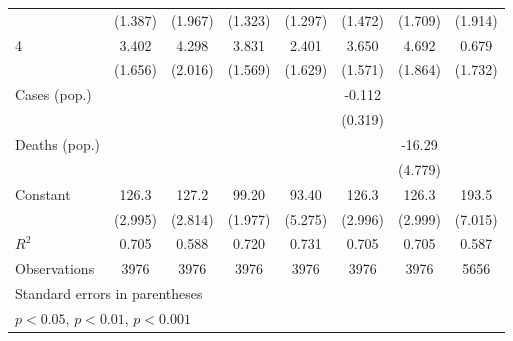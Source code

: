 \documentclass{article}
\begin{document}
{\begin{longtable}{l*{7}{c}}
                &  (1.387)         &  (1.967)         &  (1.323)         &  (1.297)         &  (1.472)         &  (1.709)         &  (1.914)         \\
4               &    3.402\sym{*}  &    4.298\sym{*}  &    3.831\sym{*}  &    2.401         &    3.650\sym{*}  &    4.692\sym{*}  &    0.679         \\
                &  (1.656)         &  (2.016)         &  (1.569)         &  (1.629)         &  (1.571)         &  (1.864)         &  (1.732)         \\
Cases (pop.)    &                  &                  &                  &                  &   -0.112         &                  &                  \\
                &                  &                  &                  &                  &  (0.319)         &                  &                  \\
Deaths (pop.)   &                  &                  &                  &                  &                  &   -16.29\sym{**} &                  \\
                &                  &                  &                  &                  &                  &  (4.779)         &                  \\
Constant        &    126.3\sym{***}&    127.2\sym{***}&    99.20\sym{***}&    93.40\sym{***}&    126.3\sym{***}&    126.3\sym{***}&    193.5\sym{***}\\
                &  (2.995)         &  (2.814)         &  (1.977)         &  (5.275)         &  (2.996)         &  (2.999)         &  (7.015)         \\
\hline
\(R^{2}\)       &    0.705         &    0.588         &    0.720         &    0.731         &    0.705         &    0.705         &    0.587         \\
Observations    &     3976         &     3976         &     3976         &     3976         &     3976         &     3976         &     5656         \\
\hline\hline
\multicolumn{8}{l}{\footnotesize Standard errors in parentheses}\\
\multicolumn{8}{l}{\footnotesize \sym{*} \(p<0.05\), \sym{**} \(p<0.01\), \sym{***} \(p<0.001\)}\\
\end{longtable}
}
\end{document}
